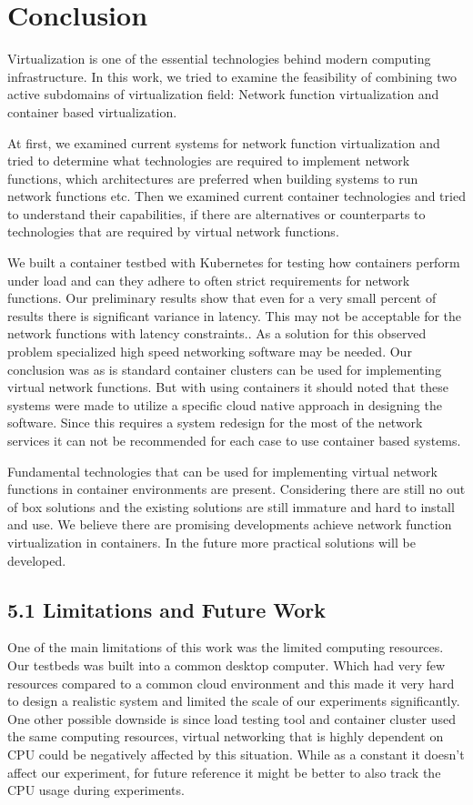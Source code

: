 \documentclass[12pt,oneandhalf,chaparabic,ceng,ms,eng,oneside,pntc]{gsufbe}
\begin{document}
\chapter{Conclusion}
Virtualization is one of the essential technologies behind modern computing infrastructure.  In this work, we
tried to examine the feasibility of combining two active subdomains of virtualization field:  Network
function virtualization and container based virtualization.

At first, we examined current systems for network function virtualization and tried to determine what
technologies are required to implement network functions, which architectures are preferred when
building systems to run network functions etc. Then we examined current container technologies and
tried to understand their capabilities, if there are alternatives or counterparts to technologies that
are required by virtual network functions.

We built a container testbed with Kubernetes for testing how containers perform under load and can they
adhere to often strict requirements for network functions.  Our preliminary results show that even for
a very small percent of results there is significant variance in latency. This may not be acceptable for
the network functions with latency constraints.. As a solution for this observed problem specialized
high speed networking software may be needed.
Our conclusion was as is standard container clusters can be used for implementing virtual network
functions. But with using containers it should noted that these systems were made to utilize a specific
cloud native approach in designing the software. Since
this requires a system redesign for the most of the network services it can not be recommended for each
case to use container based systems.

Fundamental technologies that can be used for implementing virtual network functions in
container environments are present.  Considering there are still no out of box solutions and the existing
solutions are still immature and hard to install and use.  We believe there are promising developments
achieve network
function virtualization in containers.  In the future more practical solutions will be developed.

\section[Limitations and Future Work]{5.1 Limitations and Future Work}
One of the main limitations of this work was the limited computing resources.  Our testbeds was 
built into a common desktop computer.  Which had very few resources compared to a common cloud
environment and this made it very hard to design a realistic system and limited the scale of our
experiments significantly. One other possible downside is since load testing tool and container cluster
used the same computing resources, virtual networking that is highly dependent on CPU could be negatively
affected by this situation. While as a constant it doesn't affect our experiment, for future reference it
might be better to also track the CPU usage during experiments.
\end{document}

